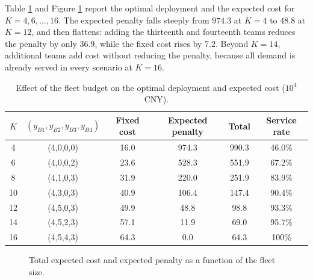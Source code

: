 \documentclass{apmcmthesis}
\begin{document}
Table \ref{tab:fleet} and Figure \ref{fig:fleet} report the optimal deployment and the expected cost for $K=4,6,\dots,16$. The expected penalty falls steeply from $974.3$ at $K=4$ to $48.8$ at $K=12$, and then flattens: adding the thirteenth and fourteenth teams reduces the penalty by only $36.9$, while the fixed cost rises by $7.2$. Beyond $K=14$, additional teams add cost without reducing the penalty, because all demand is already served in every scenario at $K=16$.

\begin{table}[!ht]
\centering
\caption{Effect of the fleet budget on the optimal deployment and expected cost ($10^{4}$ CNY).}
\label{tab:fleet}
\small
\begin{tabular}{cccccc}
\toprule
$K$ & $(y_{B1},y_{B2},y_{B3},y_{B4})$ & Fixed cost & Expected penalty & Total & Service rate \\
\midrule
4  & (4,0,0,0) & 16.0 & 974.3 & 990.3 & 46.0\% \\
6  & (4,0,0,2) & 23.6 & 528.3 & 551.9 & 67.2\% \\
8  & (4,1,0,3) & 31.9 & 220.0 & 251.9 & 83.9\% \\
10 & (4,3,0,3) & 40.9 & 106.4 & 147.4 & 90.4\% \\
12 & (4,5,0,3) & 49.9 & 48.8  & 98.8  & 93.3\% \\
14 & (4,5,2,3) & 57.1 & 11.9  & 69.0  & 95.7\% \\
16 & (4,5,4,3) & 64.3 & 0.0   & 64.3  & 100\% \\
\bottomrule
\end{tabular}
\end{table}

\begin{figure}[!ht]
\centering
{}
\caption{Total expected cost and expected penalty as a function of the fleet size.}
\label{fig:fleet}
\end{figure}
\end{document}
